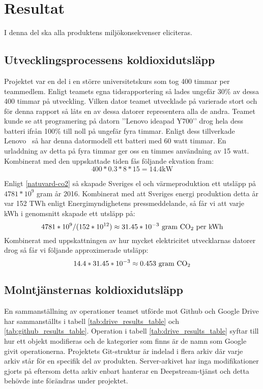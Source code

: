 \section{Resultat}
\label{sec:joel_a-results}
I denna del ska alla produktens miljökonsekvenser eliciteras. 


\subsection{Utvecklingsprocessens koldioxidutsläpp}
Projektet var en del i en större universitetskurs som tog 400 timmar per teammedlem. Enligt teamets egna tidsrapportering så lades ungefär 30\% av dessa 400 timmar på utveckling. Vilken dator teamet utvecklade på varierade stort och för denna rapport så låts en av dessa datorer representera alla de andra. Teamet kunde se att programering på datorn ’’Lenovo ideapad Y700’’ drog hela dess batteri ifrån 100\% till noll på ungefär fyra timmar. Enligt dess tillverkade Lenovo~\cite{lenovo} så har denna datormodell ett batteri med 60 watt timmar. En urladdning av detta på fyra timmar ger oss en timmes användning av 15 watt. Kombinerat med den uppskattade tiden fås följande ekvation fram: $$ 400 * 0.3 * 8* 15 = 14.4 \text{kW}$$

Enligt \ref{natuvard-co2} så skapade Sveriges el och värmeproduktion ett  utsläpp på $4781*10^9$ gram år 2016. Kombinerat med att Sveriges energi produktion detta år var 152 TWh enligt Energimyndighetens pressmeddelande\cite{elprod2016}, så får vi att varje kWh i genomsnitt skapade ett utsläpp på: $$4781*10^9 / (152 * 10^{12}) \approx 31.45 * 10^{-3} \text{ gram \ce{CO2} per kWh}$$ 
Kombinerat med uppskattningen av hur mycket elektricitet utvecklarnas datorer drog så får vi följande approximerade utsläpp: $$14.4 * 31.45 * 10^{-3} \approx 0.453 \text{ gram \ce{CO2}}$$


\subsection{Molntjänsternas koldioxidutsläpp}
En sammanställning av operationer teamet utförde mot Github och Google Drive har sammanställts i tabell \ref{tab:drive_results_table} och \ref{tab:github_results_table}. Operation i tabell \ref{tab:drive_results_table} syftar till hur ett objekt modifieras och de kategorier som finns är de namn som Google givit operationerna. Projektets Git-struktur är indelad i flera arkiv där varje arkiv står för en specifik del av produkten. Server-arkivet har inga modifikationer gjorts på eftersom detta arkiv enbart hanterar en Deepstream-tjänst och detta behövde inte förändras under projektet.


